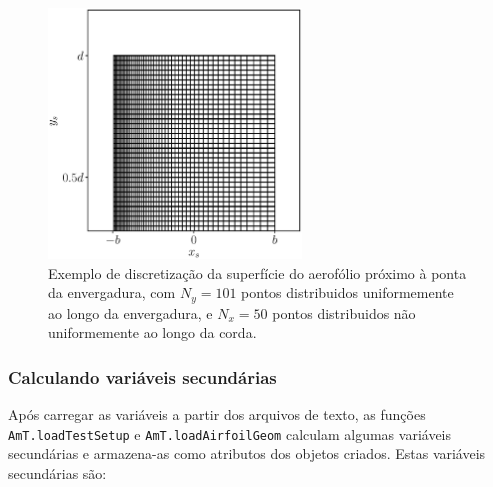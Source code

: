 \documentclass[a4paper, 11pt, twoside]{article}
\begin{document}
\begin{figure}
	\centering
	\includegraphics[width=0.6\textwidth]{../figures/Aerofoil_mesh.eps}
	\caption{Exemplo de discretização da superfície do aerofólio próximo à ponta da envergadura, com $N_y=101$ pontos distribuidos uniformemente ao longo da envergadura, e $N_x = 50$ pontos distribuidos não uniformemente ao longo da corda.}
	\label{fig:aerofoil_mesh}
\end{figure}


\subsubsection{Calculando variáveis secundárias}

Após carregar as variáveis a partir dos arquivos de texto, as funções \verb|AmT.loadTestSetup| e \verb|AmT.loadAirfoilGeom| calculam algumas variáveis secundárias e armazena-as como atributos dos objetos criados. Estas variáveis secundárias são:
\end{document}
